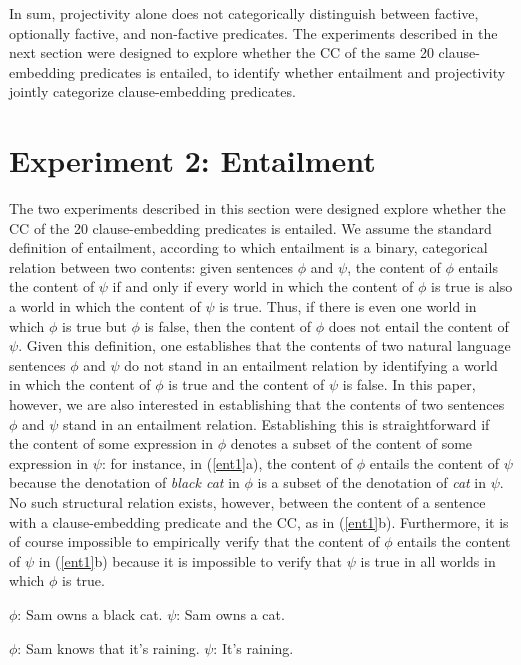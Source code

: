 \documentclass[11pt,fleqn]{article}
\newcommand{\6}{\mbox{$[\hspace*{-.6mm}[$}}
\newcommand{\9}{\mbox{$]\hspace*{-.6mm}]$}}
\begin{document}
In sum, projectivity alone does not categorically distinguish between factive, optionally factive, and non-factive predicates. The experiments described in the next section were designed to explore whether the CC of the same 20 clause-embedding predicates is entailed, to identify whether entailment and projectivity jointly categorize clause-embedding predicates.
 
\section{Experiment 2: Entailment}\label{s3}

The two experiments described in this section were designed explore whether the CC of the 20 clause-embedding predicates is entailed. We assume the standard definition of entailment, according to which entailment is a binary, categorical relation between two contents: given sentences $\phi$ and $\psi$, the content of $\phi$ entails the content of $\psi$ if and only if every world in which the content of $\phi$ is true is also a world in which the content of $\psi$ is true. Thus, if there is even one world in which $\phi$ is true but $\phi$ is false, then the content of $\phi$ does not entail the content of $\psi$. Given this definition, one establishes that the contents of two natural language sentences $\phi$ and $\psi$ do not stand in an entailment relation by identifying a world in which the content of $\phi$ is true and the content of $\psi$ is false. In this paper, however, we are also interested in establishing that the contents of two sentences $\phi$ and $\psi$  stand in an entailment relation. Establishing this is straightforward if the content of some expression in $\phi$ denotes a subset of the content of some expression in $\psi$: for instance, in (\ref{ent1}a),  the content of $\phi$ entails the content of $\psi$ because the denotation of {\em black cat} in $\phi$ is a subset of the denotation of {\em cat} in $\psi$. No such structural relation exists, however, between the content of a sentence with a clause-embedding predicate and the CC, as in (\ref{ent1}b). Furthermore, it is of course impossible to empirically verify that the content of $\phi$ entails the content of $\psi$ in (\ref{ent1}b) because it is impossible to verify that $\psi$ is true in all worlds in which $\phi$ is true. 

\begin{exe}
\ex\label{ent1}
\begin{xlist}
\ex $\phi$: Sam owns a black cat. \hspace*{1.5cm} $\psi$: Sam owns a cat.

\ex $\phi$: Sam knows that it's raining. \hspace*{.6cm} $\psi$: It's raining.

\end{xlist}
\end{exe}
\end{document}
